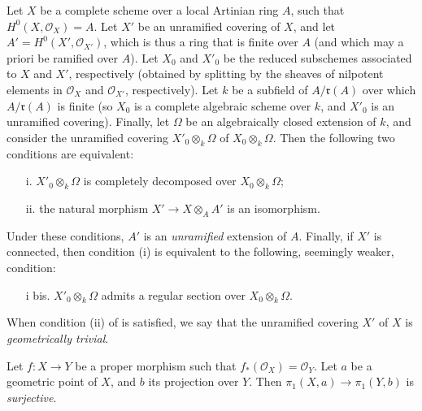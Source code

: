 \begin{lemma}\label{fga2-lemma-3}
    Let $X$ be a complete scheme over a local Artinian ring $A$, such that $H^0(X,\mathcal{O}_X)=A$.
    Let $X'$ be an unramified covering of $X$, and let $A'=H^0(X',\mathcal{O}_{X'})$, which is thus a ring that is finite over $A$ (and which may a priori be ramified over $A$).
    Let $X_0$ and $X'_0$ be the reduced subschemes associated to $X$ and $X'$, respectively (obtained by splitting by the sheaves of nilpotent elements in $\mathcal{O}_X$ and $\mathcal{O}_{X'}$, respectively).
    Let $k$ be a subfield of $A/\mathfrak{r}(A)$ over which $A/\mathfrak{r}(A)$ is finite (so $X_0$ is a complete algebraic scheme over $k$, and $X'_0$ is an unramified covering).
    Finally, let $\Omega$ be an algebraically closed extension of $k$, and consider the unramified covering $X'_0\otimes_k\Omega$ of $X_0\otimes_k\Omega$.
    Then the following two conditions are equivalent:

    \begin{enumerate}
        \item[i.] $X'_0\otimes_k\Omega$ is completely decomposed over $X_0\otimes_k\Omega$;
        \item[ii.] the natural morphism $X'\to X\otimes_AA'$ is an isomorphism.
    \end{enumerate}

    Under these conditions, $A'$ is an \emph{unramified} extension of $A$.
    Finally, if $X'$ is connected, then condition (i) is equivalent to the following, seemingly weaker, condition:

    \begin{enumerate}
        \item[i bis.] $X'_0\otimes_k\Omega$ admits a regular section over $X_0\otimes_k\Omega$.
    \end{enumerate}
\end{lemma}


When condition (ii) of  is satisfied, we say that the unramified covering $X'$ of $X$ is \emph{geometrically trivial}.


\begin{lemma}\label{fga2-lemma-4}

    Let $f\colon X\to Y$ be a proper morphism such that $f_*(\mathcal{O}_X)=\mathcal{O}_Y$.
    Let $a$ be a geometric point of $X$, and $b$ its projection over $Y$.
    Then $\pi_1(X,a)\to\pi_1(Y,b)$ is \emph{surjective}.
\end{lemma}

